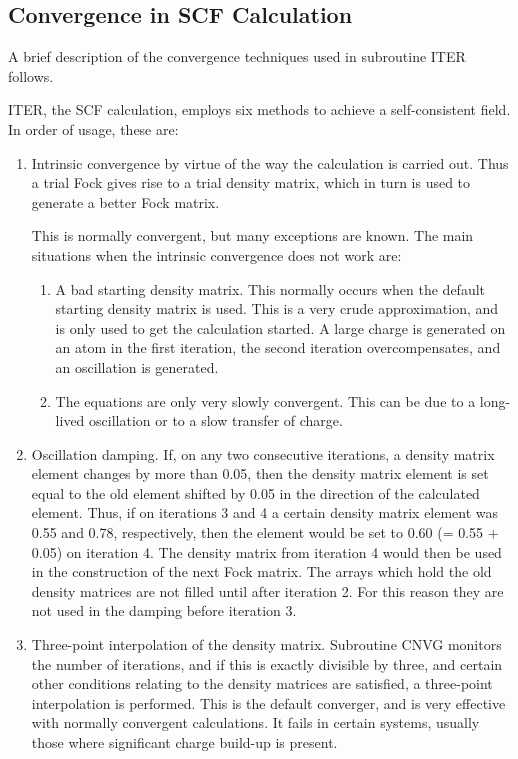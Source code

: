 \subsection{Convergence in SCF Calculation}
A  brief  description  of  the  convergence  techniques   used   in subroutine
ITER follows.

ITER, the  SCF  calculation,  employs  six  methods  to  achieve  a
self-consistent field.  In order of usage, these are:

\begin{enumerate}
\item Intrinsic convergence by virtue of the way the  calculation  is carried 
out.   Thus  a trial Fock gives rise to a trial density matrix, which in turn
is used to generate a better Fock matrix.

This is normally convergent, but many exceptions  are  known.   The main
situations when the intrinsic convergence does not work are:
\begin{enumerate}
\item A bad starting density  matrix.   This  normally  occurs when the default
starting density matrix is used.  This is a very crude approximation, and is
only  used  to  get  the  calculation started.   A  large  charge  is generated
on an atom in the first iteration,  the  second   iteration  
overcompensates,   and   an oscillation is generated.

\item The equations are only very slowly convergent.  This can be  due  to  a 
long-lived  oscillation  or to a slow transfer of charge.
\end{enumerate}

\item Oscillation damping.  If, on any two consecutive iterations,  a density 
matrix  element  changes  by  more  than 0.05, then the density matrix element
is set equal to the old element shifted by  0.05  in  the direction  of  the
calculated element.  Thus, if on iterations 3 and 4 a certain density matrix
element was 0.55 and 0.78, respectively, then the element  would  be set to
0.60 (= 0.55 + 0.05) on iteration 4.  The density matrix from iteration 4 would
then be used in the  construction  of  the next  Fock  matrix.   The arrays
which hold the old density matrices are not filled until after iteration 2. 
For this reason they are  not  used in the damping before iteration 3.

\item Three-point interpolation of the  density  matrix.   Subroutine CNVG
monitors the number of iterations, and if this is exactly divisible by three,
and certain other conditions relating to the density  matrices are  satisfied, 
a  three-point interpolation is performed.  This is the default converger, 
and  is  very  effective  with  normally  convergent calculations.    It 
fails  in  certain  systems,  usually  those  where significant charge build-up
is present.


\end{enumerate}
